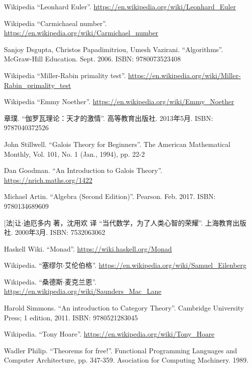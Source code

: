 \documentclass{article}
\begin{document}
\begin{thebibliography}{99}
Wikipedia ``Leonhard Euler''. \url{https://en.wikipedia.org/wiki/Leonhard_Euler}

Wikipedia ``Carmichaeal number''. \url{https://en.wikipedia.org/wiki/Carmichael_number}

Sanjoy Dsgupta, Christos Papadimitriou, Umesh Vazirani. ``Algorithms''. McGraw-Hill Education. Sept. 2006. ISBN: 9780073523408

Wikipedia ``Miller-Rabin primality test''. \url{https://en.wikipedia.org/wiki/Miller-Rabin_primality_test}

Wikipedia ``Emmy Noether''. \url{https://en.wikipedia.org/wiki/Emmy_Noether}

{\fontspec{\cnmainft}章璞. ``伽罗瓦理论：天才的激情''. 高等教育出版社.} 2013年5月. ISBN: 9787040372526

John Stillwell. ``Galois Theory for Beginners''. The American Mathematical Monthly, Vol. 101, No. 1 (Jan., 1994), pp. 22-2

Dan Goodman. ``An Introduction to Galois Theory''. \url{https://nrich.maths.org/1422}

Michael Artin. ``Algebra (Second Edition)''. Pearson. Feb. 2017. ISBN: 9780134689609


[法]让$\cdot$迪厄多内 著，沈用欢 译 ``当代数学，为了人类心智的荣耀''. 上海教育出版社. 2000年3月. ISBN: 7532063062

Haskell Wiki. ``Monad''. \url{https://wiki.haskell.org/Monad}

Wikipedia. ``塞缪尔$\cdot$艾伦伯格''. \url{https://en.wikipedia.org/wiki/Samuel_Eilenberg}

Wikipedia. ``桑德斯$\cdot$麦克兰恩''. \url{https://en.wikipedia.org/wiki/Saunders_Mac_Lane}

Harold Simmons. ``An introduction to Category Theory''.  Cambridge University Press; 1 edition, 2011. ISBN: 9780521283045

Wikipedia. ``Tony Hoare''. \url{https://en.wikipedia.org/wiki/Tony_Hoare}

Wadler Philip. ``Theorems for free!''. Functional Programming Languages and Computer Architecture, pp. 347-359. Asociation for Computing Machinery. 1989.


\end{thebibliography}
\end{document}
